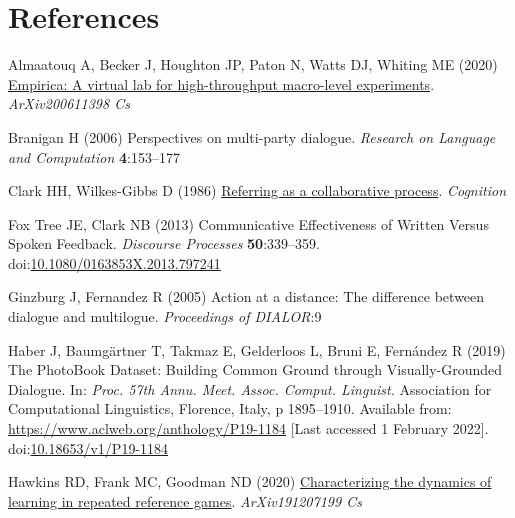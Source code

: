 \documentclass[
  english,
  a4paper,
]{article}
\newlength{\cslhangindent}
\newlength{\cslentryspacingunit} %
\newenvironment{CSLReferences}[2] %
 {%
  \setlength{\parindent}{0pt}
  \ifodd #1
  \let\oldpar\par
  \def\par{\hangindent=\cslhangindent\oldpar}
  \fi
  \setlength{\parskip}{#2\cslentryspacingunit}
 }%
 {}
\begin{document}
\hypertarget{references}{%
\section{References}\label{references}}

\setlength{\parindent}{-0.1in} 
\setlength{\leftskip}{0.125in}

\noindent

\hypertarget{refs}{}
\begin{CSLReferences}{1}{0}
\leavevmode{}%
Almaatouq A, Becker J, Houghton JP, Paton N, Watts DJ, Whiting ME (2020) \href{http://arxiv.org/abs/2006.11398}{Empirica: A virtual lab for high-throughput macro-level experiments}. \emph{ArXiv200611398 Cs}

\leavevmode{}%
Branigan H (2006) Perspectives on multi-party dialogue. \emph{Research on Language and Computation} \textbf{4}:153--177

\leavevmode{}%
Clark HH, Wilkes-Gibbs D (1986) \href{http://www.speech.kth.se/~edlund/bielefeld/references/clark-and-wilkes-gibbs-1986.pdf}{Referring as a collaborative process}. \emph{Cognition}

\leavevmode{}%
Fox Tree JE, Clark NB (2013) Communicative {Effectiveness} of {Written Versus Spoken Feedback}. \emph{Discourse Processes} \textbf{50}:339--359. doi:\href{https://doi.org/10.1080/0163853X.2013.797241}{10.1080/0163853X.2013.797241}

\leavevmode{}%
Ginzburg J, Fernandez R (2005) Action at a distance: The difference between dialogue and multilogue. \emph{Proceedings of DIALOR}:9

\leavevmode{}%
Haber J, Baumgärtner T, Takmaz E, Gelderloos L, Bruni E, Fernández R (2019) The {PhotoBook Dataset}: {Building Common Ground} through {Visually-Grounded Dialogue}. In: \emph{Proc. 57th {Annu}. {Meet}. {Assoc}. {Comput}. {Linguist}.} {Association for Computational Linguistics}, {Florence, Italy}, p 1895--1910. Available from: \url{https://www.aclweb.org/anthology/P19-1184} {[}Last accessed 1 February 2022{]}. doi:\href{https://doi.org/10.18653/v1/P19-1184}{10.18653/v1/P19-1184}

\leavevmode{}%
Hawkins RD, Frank MC, Goodman ND (2020) \href{http://arxiv.org/abs/1912.07199}{Characterizing the dynamics of learning in repeated reference games}. \emph{ArXiv191207199 Cs}


\end{CSLReferences}
\end{document}
